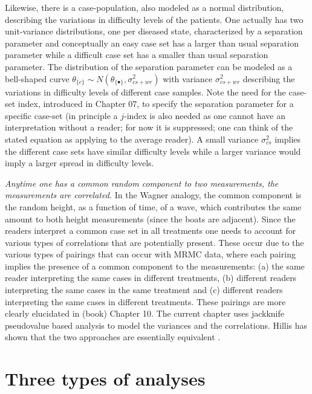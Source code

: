 \documentclass[
]{book}
\begin{document}
Likewise, there is a case-population, also modeled as a normal distribution, describing the variations in difficulty levels of the patients. One actually has two unit-variance distributions, one per diseased state, characterized by a separation parameter and conceptually an easy case set has a larger than usual separation parameter while a difficult case set has a smaller than usual separation parameter. The distribution of the separation parameter can be modeled as a bell-shaped curve \(\theta_{\{c\}} \sim N\left ( \theta_{\{\bullet\}}, \sigma_{cs+wr}^{2} \right )\) with variance \(\sigma_{cs+wr}^{2}\) describing the variations in difficulty levels of different case samples. Note the need for the case-set index, introduced in Chapter 07, to specify the separation parameter for a specific case-set (in principle a \(j\)-index is also needed as one cannot have an interpretation without a reader; for now it is suppressed; one can think of the stated equation as applying to the average reader). A small variance \(\sigma_{cs}^{2}\) implies the different case sets have similar difficulty levels while a larger variance would imply a larger spread in difficulty levels.

\emph{Anytime one has a common random component to two measurements, the measurements are correlated.} In the Wagner analogy, the common component is the random height, as a function of time, of a wave, which contributes the same amount to both height measurements (since the boats are adjacent). Since the readers interpret a common case set in all treatments one needs to account for various types of correlations that are potentially present. These occur due to the various types of pairings that can occur with MRMC data, where each pairing implies the presence of a common component to the measurements: (a) the same reader interpreting the same cases in different treatments, (b) different readers interpreting the same cases in the same treatment and (c) different readers interpreting the same cases in different treatments. These pairings are more clearly elucidated in (book) Chapter 10. The current chapter uses jackknife pseudovalue based analysis to model the variances and the correlations. Hillis has shown that the two approaches are essentially equivalent \citep{RN1866}.

\hypertarget{three-types-of-analyses}{%
\section{Three types of analyses}\label{three-types-of-analyses}}
\end{document}
